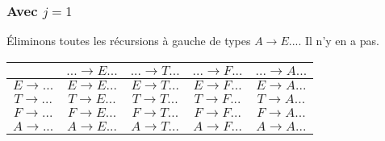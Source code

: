 \documentclass[class=article]{standalone}
\begin{document}
\subsubsection*{Avec $j = 1$}
Éliminons toutes les récursions à gauche de types $A \rightarrow E...$. Il n'y en a pas.
\begin{center}
    \begin{tabular}{c|c|c|c|c|}
        \cellcolor[HTML]{FFFFFF}                     & 
        \cellcolor[HTML]{FFFFFF} $... \rightarrow E...$ &
        \cellcolor[HTML]{FFFFFF} $... \rightarrow T...$ & 
        \cellcolor[HTML]{FFFFFF} $... \rightarrow F...$ & 
        \cellcolor[HTML]{FFFFFF} $... \rightarrow A...$ \\
    \hline
        \cellcolor[HTML]{FFFFFF} $E \rightarrow ...$ & 
        \cellcolor[HTML]{FF0000} $E \rightarrow E...$ & 
        \cellcolor[HTML]{ABFF00} $E \rightarrow T...$ & 
        \cellcolor[HTML]{ABFF00} $E \rightarrow F...$ & 
        \cellcolor[HTML]{ABFF00} $E \rightarrow A...$ \\
    \hline
        \cellcolor[HTML]{FFFFFF} $T \rightarrow ...$ & 
        \cellcolor[HTML]{FF0000} $T \rightarrow E...$ & 
        \cellcolor[HTML]{FF0000} $T \rightarrow T...$ & 
        \cellcolor[HTML]{ABFF00} $T \rightarrow F...$ &
        \cellcolor[HTML]{ABFF00} $T \rightarrow A...$ \\
    \hline
        \cellcolor[HTML]{FFFFFF} $F \rightarrow ...$ &
        \cellcolor[HTML]{FF0000} $F \rightarrow E...$ &
        \cellcolor[HTML]{FF0000} $F \rightarrow T...$ & 
        \cellcolor[HTML]{FF0000} $F \rightarrow F...$ & 
        \cellcolor[HTML]{ABFF00} $F \rightarrow A...$ \\
    \hline
        \cellcolor[HTML]{FFFFFF} $A \rightarrow ...$ & 
        \cellcolor[HTML]{FF0000} $A \rightarrow E...$ & 
        \cellcolor[HTML]{FFFFFF} $A \rightarrow T...$ & 
        \cellcolor[HTML]{FFFFFF} $A \rightarrow F...$ & 
        \cellcolor[HTML]{FFFFFF} $A \rightarrow A...$ \\
    \hline
    \end{tabular}
\end{center}
\end{document}
